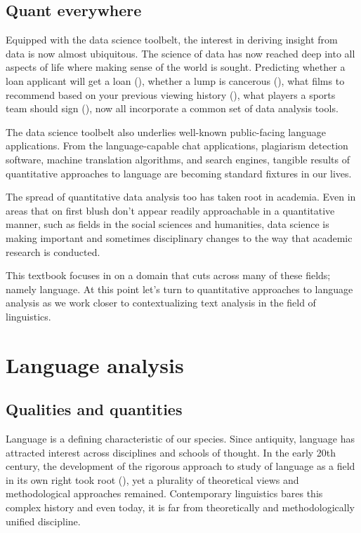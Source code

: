 \documentclass[
  letterpaper,
]{latex/krantz}
\theoremstyle{definition}
\theoremstyle{remark}
\begin{document}
\subsection{Quant everywhere}\label{quant-everywhere}

Equipped with the data science toolbelt, the interest in deriving
insight from data is now almost ubiquitous. The science of data has now
reached deep into all aspects of life where making sense of the world is
sought. Predicting whether a loan applicant will get a loan
(), whether a lump is
cancerous (),
what films to recommend based on your previous viewing history
(), what
players a sports team should sign (), now all incorporate a common set of data analysis tools.

The data science toolbelt also underlies well-known public-facing
language applications. From the language-capable chat applications,
plagiarism detection software, machine translation algorithms, and
search engines, tangible results of quantitative approaches to language
are becoming standard fixtures in our lives.

The spread of quantitative data analysis too has taken root in academia.
Even in areas that on first blush don't appear readily approachable in a
quantitative manner, such as fields in the social sciences and
humanities, data science is making important and sometimes disciplinary
changes to the way that academic research is conducted.

This textbook focuses in on a domain that cuts across many of these
fields; namely language. At this point let's turn to quantitative
approaches to language analysis as we work closer to contextualizing
text analysis in the field of linguistics.

\section{Language analysis}\label{language-analysis}

\subsection{Qualities and quantities}\label{qualities-and-quantities}

Language is a defining characteristic of our species. Since antiquity,
language has attracted interest across disciplines and schools of
thought. In the early 20th century, the development of the rigorous
approach to study of language as a field in its own right took root
(), yet a plurality of
theoretical views and methodological approaches remained. Contemporary
linguistics bares this complex history and even today, it is far from
theoretically and methodologically unified discipline.
\end{document}
